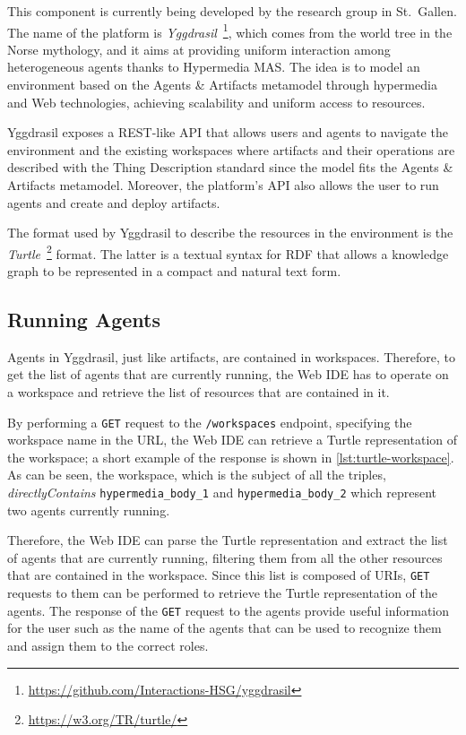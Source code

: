 This component is currently being developed by the research group in St.\ Gallen.
The name of the platform is \textit{Yggdrasil}~\footnote{\url{https://github.com/Interactions-HSG/yggdrasil}}, which comes from the world tree in the Norse mythology, and it aims at providing uniform interaction among heterogeneous agents thanks to Hypermedia MAS.
The idea is to model an environment based on the Agents \& Artifacts metamodel through hypermedia and Web technologies, achieving scalability and uniform access to resources.

Yggdrasil exposes a REST-like API that allows users and agents to navigate the environment and the existing workspaces where artifacts and their operations are described with the Thing Description standard since the model fits the Agents \& Artifacts metamodel.
Moreover, the platform's API also allows the user to run agents and create and deploy artifacts.

The format used by Yggdrasil to describe the resources in the environment is the \textit{Turtle}~\footnote{\url{https://w3.org/TR/turtle/}} format.
The latter is a textual syntax for RDF that allows a knowledge graph to be represented in a compact and natural text form.

\subsection{Running Agents}
Agents in Yggdrasil, just like artifacts, are contained in workspaces.
Therefore, to get the list of agents that are currently running, the Web IDE has to operate on a workspace and retrieve the list of resources that are contained in it.

By performing a \texttt{GET} request to the \texttt{/workspaces} endpoint, specifying the workspace name in the URL, the Web IDE can retrieve a Turtle representation of the workspace; a short example of the response is shown in \cref{lst:turtle-workspace}.
As can be seen, the workspace, which is the subject of all the triples, \textit{directlyContains} \texttt{hypermedia\_body\_1} and \texttt{hypermedia\_body\_2} which represent two agents currently running.

\begin{figure}
    
\end{figure}

Therefore, the Web IDE can parse the Turtle representation and extract the list of agents that are currently running, filtering them from all the other resources that are contained in the workspace.
Since this list is composed of URIs, \texttt{GET} requests to them can be performed to retrieve the Turtle representation of the agents.
The response of the \texttt{GET} request to the agents provide useful information for the user such as the name of the agents that can be used to recognize them and assign them to the correct roles.


